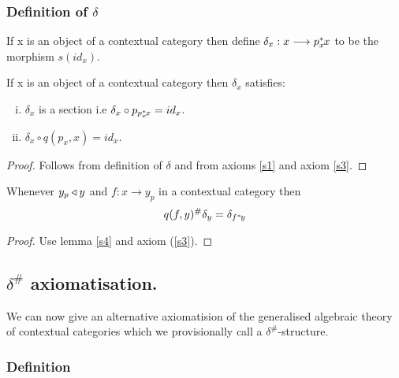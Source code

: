 \documentclass[10pt,a4paper]{scrartcl}
\renewcommand{\sub}{^*\kern-1pt}
\newcommand{\hash}{^\#}
\begin{document}
\subsubsection {Definition of $\delta$}

If x is an object of a contextual category  then define $\delta_x: x \longrightarrow p_x \sub x$ to be
the morphism $s(id_x)$.

\begin{lemma}
\label {deltalemma}
If x is an object of a contextual category  then $\delta_x$ satisfies:
\begin{enumerate}[(i)]
\item $\delta_x$ is a section i.e $\delta_x \circ p_{p_x \sub x} = id_x$.
\item $\delta_x \circ q(p_x,x) = id_x$.
\end{enumerate}
\end{lemma}
\begin{proof}
Follows from definition of $\delta$ and from axioms \ref{s1} and axiom \ref{s3}.
\end{proof}

\begin{lemma}
\label {deltalemma2}
Whenever $y_p \triangleleft y$ and
$f: x \longrightarrow y_p$ in a contextual category  then 
\begin{equation*}
q(f,y) \hash \delta_y   = \delta_{f \sub y}
\end{equation*}
\end{lemma}
\begin{proof}
Use lemma \ref{s4} and axiom (\ref{s3}).
\end{proof}

\subsection{$\delta\hash$ axiomatisation.}
We can now give an alternative axiomatision of the generalised algebraic theory of contextual categories which we provisionally call a $\delta\hash$-structure. 

\subsubsection{Definition}
\end{document}
